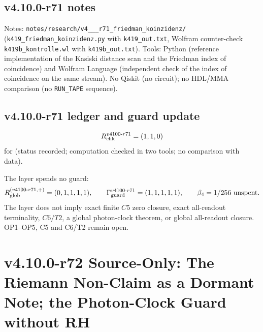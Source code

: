 \subsection*{v4.10.0-r71 notes}
\label{subsec:v4100-r71-notes}

{\raggedright
Notes: \texttt{notes/\allowbreak research/\allowbreak v4\_\_\_\allowbreak r71\_\allowbreak friedman\_\allowbreak koinzidenz/}
(\texttt{k419\_\allowbreak friedman\_\allowbreak koinzidenz.py} with \texttt{k419\_\allowbreak out.txt}, Wolfram counter-check
\texttt{k419b\_\allowbreak kontrolle.wl} with \texttt{k419b\_\allowbreak out.txt}).
Tools: Python (reference implementation of the Kasiski distance scan and the Friedman index of coincidence) and Wolfram
Language (independent check of the index of coincidence on the same stream).  No Qiskit (no circuit); no HDL/MMA comparison
(no \texttt{RUN\_TAPE} sequence).
\par}

\subsection*{v4.10.0-r71 ledger and guard update}
\label{subsec:v4100-r71-ledger-guard}

\[
R_{\rm chk}^{v4100\text{-}r71}=(1,1,0)
\]
for (status recorded; computation checked in two tools; no comparison with data).

The layer spends no guard:
\[
R_{\rm glob}^{(v4100\text{-}r71,+)}=(0,1,1,1,1),
\qquad
\Gamma_{\rm guard}^{v4100\text{-}r71}=(1,1,1,1,1),
\qquad
\beta_4=1/256\ \text{unspent}.
\]
The layer does not imply exact finite \(C5\) zero closure, exact all-readout terminality, \(C6/T2\), a global photon-clock theorem,
or global all-readout closure.  OP1--OP5, C5 and C6/T2 remain open.

\clearpage
\section*{v4.10.0-r72 Source-Only: The Riemann Non-Claim as a Dormant Note; the Photon-Clock Guard without RH}
\label{sec:v4100-r72-rh-dormant}

